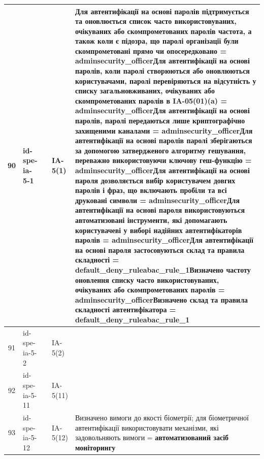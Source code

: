 \documentclass[10pt]{article}
\begin{document}
\begin{longtable}{|c|>{\raggedright\arraybackslash}p{4cm}|>{\raggedright\arraybackslash}p{2.5cm}|>{\raggedright\arraybackslash}p{3.5cm}|>{\raggedright\arraybackslash}p{5.5cm}|}
90 & id-spe-ia-5-1 &  & IA-5(1) & Для автентифікації на основі паролів підтримується та оновлюється список часто використовуваних, очікуваних або скомпрометованих паролів частота, а також коли є підозра, що паролі організації були скомпрометовані прямо чи опосередковано = \textbf{adminsecurity\_\allowbreak{}officer}\newline Для автентифікації на основі паролів, коли паролі створюються або оновлюються користувачами, паролі перевіряються на відсутність у списку загальновживаних, очікуваних або скомпрометованих паролів в IA-05(01)(a) = \textbf{adminsecurity\_\allowbreak{}officer}\newline Для автентифікації на основі паролів, паролі передаються лише криптографічно захищеними каналами = \textbf{adminsecurity\_\allowbreak{}officer}\newline Для автентифікації на основі паролів паролі зберігаються за допомогою затвердженого алгоритму гешування, переважно використовуючи ключову геш-функцію = \textbf{adminsecurity\_\allowbreak{}officer}\newline Для автентифікації на основі пароля дозволяється вибір користувачем довгих паролів і фраз, що включають пробіли та всі друковані символи = \textbf{adminsecurity\_\allowbreak{}officer}\newline Для автентифікації на основі пароля використовуються автоматизовані інструменти, які допомагають користувачеві у виборі надійних автентифікаторів паролів = \textbf{adminsecurity\_\allowbreak{}officer}\newline Для автентифікації на основі пароля застосовуються склад та правила складності = \textbf{default\_\allowbreak{}deny\_\allowbreak{}ruleabac\_\allowbreak{}rule\_\allowbreak{}1}\newline Визначено частоту оновлення списку часто використовуваних, очікуваних або скомпрометованих паролів = \textbf{adminsecurity\_\allowbreak{}officer}\newline Визначено склад та правила складності автентифікатора = \textbf{default\_\allowbreak{}deny\_\allowbreak{}ruleabac\_\allowbreak{}rule\_\allowbreak{}1} \\ \hline
91 & id-spe-ia-5-2 &  & IA-5(2) &  \\ \hline
92 & id-spe-ia-5-11 &  & IA-5(11) &  \\ \hline
93 & id-spe-ia-5-12 &  & IA-5(12) & Визначено вимоги до якості біометрії; для біометричної автентифікації використовувати механізми, які задовольняють вимоги = \textbf{автоматизований засіб моніторингу} \\ \hline

\end{longtable}
\end{document}
